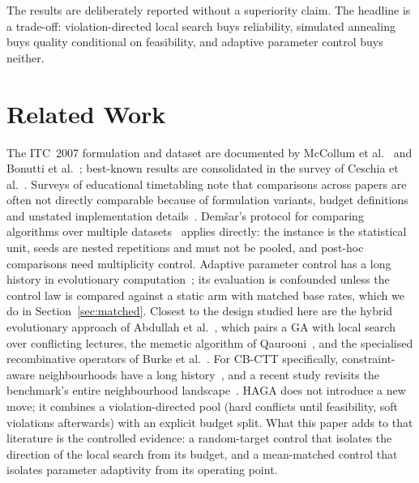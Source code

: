 \documentclass[journal]{IEEEtran}
\begin{document}
The results are deliberately reported without a superiority claim. The headline is a trade-off: violation-directed local search buys reliability, simulated annealing buys quality conditional on feasibility, and adaptive parameter control buys neither.

\section{Related Work}
The ITC~2007 formulation and dataset are documented by McCollum et al.~\cite{mccollum2009setting} and Bonutti et al.~\cite{bonutti2012benchmarking}; best-known results are consolidated in the survey of Ceschia et al.~\cite{ceschia2022educational}. Surveys of educational timetabling note that comparisons across papers are often not directly comparable because of formulation variants, budget definitions and unstated implementation details~\cite{bettinelli2015survey,chen2021survey}. Dem\v{s}ar's protocol for comparing algorithms over multiple datasets~\cite{demsar2006statistical} applies directly: the instance is the statistical unit, seeds are nested repetitions and must not be pooled, and post-hoc comparisons need multiplicity control. Adaptive parameter control has a long history in evolutionary computation~\cite{eiben1999parameter,goldberg1989genetic}; its evaluation is confounded unless the control law is compared against a static arm with matched base rates, which we do in Section~\ref{sec:matched}. Closest to the design studied here are the hybrid evolutionary approach of Abdullah et al.~\cite{abdullah2007hybrid}, which pairs a GA with local search over conflicting lectures, the memetic algorithm of Qaurooni~\cite{qaurooni2011memetic}, and the specialised recombinative operators of Burke et al.~\cite{burke1995specialised}. For CB-CTT specifically, constraint-aware neighbourhoods have a long history~\cite{lu2010adaptive,geiger2010threshold}, and a recent study revisits the benchmark's entire neighbourhood landscape~\cite{ceschia2026revisiting}. HAGA does not introduce a new move; it combines a violation-directed pool (hard conflicts until feasibility, soft violations afterwards) with an explicit budget split. What this paper adds to that literature is the controlled evidence: a random-target control that isolates the direction of the local search from its budget, and a mean-matched control that isolates parameter adaptivity from its operating point.
\end{document}
